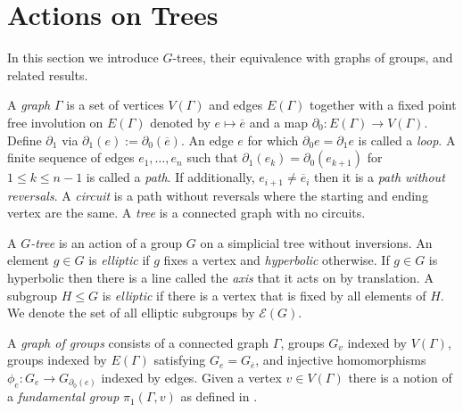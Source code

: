 \documentclass[12pt,parskip=full]{report}
\theoremstyle{plain}
\theoremstyle{definition}
\newtheorem{exa}[thm]{Example}
\begin{document}















\section{Actions on Trees}

In this section we introduce \(G\)-trees, their equivalence with graphs of groups, and related results.

A \emph{graph} \(\Gamma\) is a set of vertices \(V(\Gamma)\) and edges \(E(\Gamma)\) together with a fixed point free involution on \(E(\Gamma)\) denoted by \(e\mapsto \overline{e}\) and a map \(\partial_0: E(\Gamma)\to V(\Gamma)\). Define \(\partial_1\) via \(\partial_1(e):=\partial_0(\overline{e})\). An edge \(e\) for which \(\partial_0e=\partial_1e\) is called a \emph{loop}. A finite sequence of edges \(e_1, \ldots, e_n\) such that \(\partial_1(e_{k}) = \partial_0(e_{k+1})\) for \(1\leq k\leq n-1\) is called a \emph{path}. If additionally, \(e_{i+1}\neq \overline{e}_i\) then it is a \emph{path without reversals}. A \emph{circuit} is a path without reversals where the starting and ending vertex are the same. A \emph{tree} is a connected graph with no circuits.

A \emph{\(G\)-tree} is an action of a group \(G\) on a simplicial tree without inversions. An element \(g\in G\) is \emph{elliptic} if \(g\) fixes a vertex and \emph{hyperbolic} otherwise. If \(g\in G\) is hyperbolic then there is a line called the \emph{axis} that it acts on by translation.  A subgroup \(H\leq G\) is \emph{elliptic} if there is a vertex that is fixed by all elements of \(H\). We denote the set of all elliptic subgroups by \(\mathcal{E}(G)\).

A \emph{graph of groups} consists of a connected graph \(\Gamma\), groups \(G_v\) indexed by \(V(\Gamma)\), groups indexed by \(E(\Gamma)\) satisfying \(G_e=G_\overline{e}\), and injective homomorphisms \(\phi_e: G_e\to G_{\partial_0(e)}\) indexed by edges. Given a vertex \(v\in V(\Gamma)\) there is a notion of a \emph{fundamental group} \(\pi_1(\Gamma, v)\) as defined in \cite{serretrees}.
\end{document}
